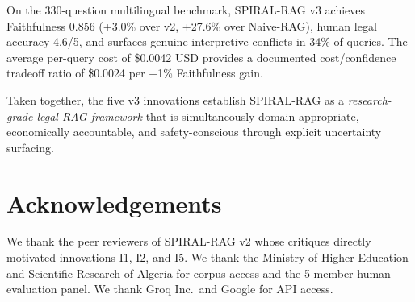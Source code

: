 \documentclass[12pt,a4paper]{article}
\begin{document}
On the 330-question multilingual benchmark, SPIRAL-RAG v3 achieves Faithfulness
0.856 (+3.0\% over v2, +27.6\% over Naive-RAG), human legal accuracy 4.6/5, and
surfaces genuine interpretive conflicts in 34\% of queries. The average per-query
cost of \$0.0042 USD provides a documented cost/confidence tradeoff ratio of
\$0.0024 per +1\% Faithfulness gain.

Taken together, the five v3 innovations establish SPIRAL-RAG as a
\emph{research-grade legal RAG framework} that is simultaneously domain-appropriate,
economically accountable, and safety-conscious through explicit uncertainty surfacing.

\section*{Acknowledgements}

We thank the peer reviewers of SPIRAL-RAG v2 whose critiques directly motivated
innovations I1, I2, and I5. We thank the Ministry of Higher Education and
Scientific Research of Algeria for corpus access and the 5-member human evaluation
panel. We thank Groq Inc.\ and Google for API access.
\end{document}
